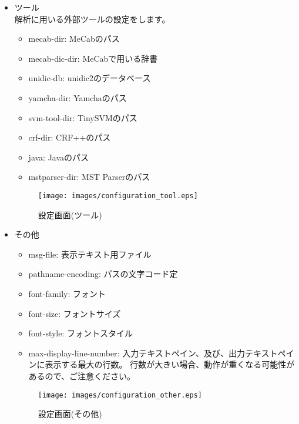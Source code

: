 \documentclass[titlepage]{jarticle}
\begin{document}
\begin{itemize}
\item ツール\\
解析に用いる外部ツールの設定をします。
\begin{itemize}
\item mecab-dir: MeCabのパス
\item mecab-dic-dir: MeCabで用いる辞書
\item unidic-db: unidic2のデータベース
\item yamcha-dir: Yamchaのパス
\item svm-tool-dir: TinySVMのパス
\item crf-dir: CRF++のパス
\item java: Javaのパス
\item mstparser-dir: MST Parserのパス
\end{itemize}
\begin{figure}[!h]
\begin{center}
\texttt{[image: images/configuration\_tool.eps]}
\caption{設定画面(ツール)}
\vspace{-5mm}
\label{configuration_tool}
\end{center}
\end{figure}

\item その他
\begin{itemize}
\item msg-file: 表示テキスト用ファイル
\item pathname-encoding: パスの文字コード定
\item font-family: フォント
\item font-size: フォントサイズ
\item font-style: フォントスタイル
\item max-display-line-number: 入力テキストペイン、及び、出力テキストペインに表示する最大の行数。
行数が大きい場合、動作が重くなる可能性があるので、ご注意ください。
\end{itemize}
\begin{figure}[!h]
\begin{center}
\texttt{[image: images/configuration\_other.eps]}
\caption{設定画面(その他)}
\vspace{-5mm}
\label{configuration_other}
\end{center}
\end{figure}

\end{itemize}
\end{document}
